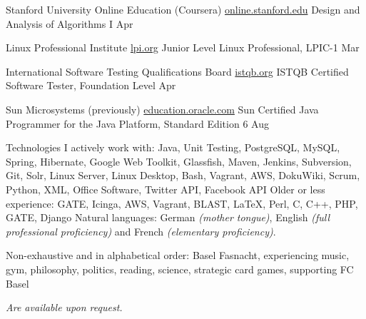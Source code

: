 \documentclass[10pt,a4paper]{article}
\begin{document}
\headedsection
  {Stanford University Online Education (Coursera)}
  {\href{http://online.stanford.edu/courses}{online.stanford.edu}} {%
  \headedsubsection
    {Design and Analysis of Algorithms I}
    {Apr }
    {\bodytext{}}
}

\headedsection
  {Linux Professional Institute}
  {\href{https://www.lpi.org/linux-certifications/programs}{lpi.org}} {%
  \headedsubsection
    {Junior Level Linux Professional, LPIC-1}
    {Mar }
    {\bodytext{}}
}

\headedsection
  {International Software Testing Qualifications Board}
  {\href{http://www.istqb.org/certification-path-root/foundation-level/foundation-level-content.html}{istqb.org}} {%
  \headedsubsection
    {ISTQB Certified Software Tester,  Foundation Level}
    {Apr }
    {\bodytext{}}
}


\headedsection
  {Sun Microsystems (previously)}
  {\href{http://education.oracle.com/}{education.oracle.com}} {%
  \headedsubsection
    {Sun Certified Java Programmer for the Java Platform, Standard Edition 6}
    {Aug }
    {\bodytext{}}
}

\spacedhrule{0.5em}{-0.4em}


\inlineheadsection  %
  {Technologies I actively work with:}
  {Java, Unit Testing, PostgreSQL, MySQL, Spring, Hibernate, Google Web Toolkit, Glassfish, Maven, Jenkins, Subversion, Git, Solr, Linux Server, Linux Desktop, Bash, Vagrant, AWS, DokuWiki, Scrum, Python, XML, Office Software, Twitter API, Facebook API}
\inlineheadsection
  {Older or less experience:}
  {GATE, Icinga, AWS, Vagrant, BLAST, LaTeX, Perl, C, C++, PHP, GATE, Django}
\inlineheadsection
  {Natural languages:}
  {German \emph{(mother tongue)}, English \emph{(full professional proficiency)} and French \emph{(elementary proficiency)}.}

\spacedhrule{1.6em}{-0.4em}


\inlineheadsection
  {Non-exhaustive and in alphabetical order:}
  {Basel Fasnacht, experiencing music, gym, philosophy, politics, reading, science, strategic card games, supporting FC Basel}

\spacedhrule{1.6em}{-0.4em}

\emph{Are available upon request.}
\end{document}
